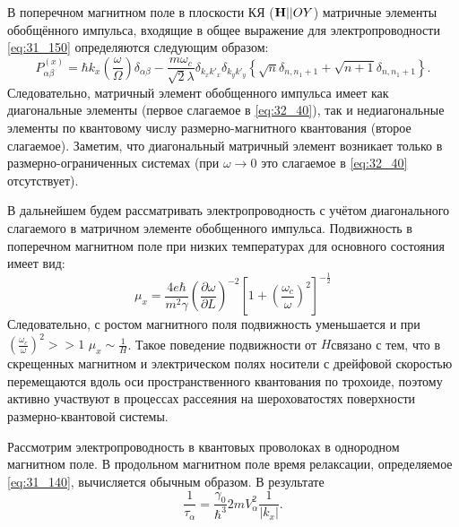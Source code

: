 В поперечном магнитном поле в плоскости КЯ ($\boldsymbol{\mathbf{H}} || OY$) матричные элементы обобщённого импульса, входящие в общее выражение для электропроводности \eqref{eq:31_150} определяются следующим образом:
\begin{equation} \label{eq:32_40}
P_{\alpha \beta }^{\left(x\right)} =\hbar k_{x} \left(\frac{\omega }{\Omega } \right)\delta _{\alpha \beta } -\frac{m\omega _{c} }{\sqrt{2} \lambda } \delta _{k_{x} k'_{x} } \delta _{k_{y} k'_{y} } \left\{\sqrt{n} \delta _{n,n_{1} +1} +\sqrt{n+1} \delta _{n,n_{1} +1} \right\}.
\end{equation}
Следовательно, матричный элемент обобщенного импульса имеет как диагональные элементы (первое слагаемое в \eqref{eq:32_40}), так и недиагональные элементы по квантовому числу размерно-магнитного квантования (второе слагаемое). Заметим, что диагональный матричный элемент возникает только в размерно-ограниченных системах (при $\omega \to 0$ это слагаемое в \eqref{eq:32_40} отсутствует).

В дальнейшем будем рассматривать электропроводность с учётом диагонального слагаемого в матричном элементе обобщенного импульса. Подвижность в поперечном магнитном поле при низких температурах для основного состояния имеет вид:
\begin{equation} \label{eq:32_50}
\mu _{x} =\frac{4e\hbar }{m^{2} \gamma } \left(\frac{\partial \omega }{\partial L} \right)^{-2} \left[1+\left(\frac{\omega _{c} }{\omega } \right)^{2} \right]^{-\frac{1}{2} }
\end{equation}
Следовательно, с ростом магнитного поля подвижность уменьшается и при $\left(\frac{\omega _{c} }{\omega } \right)^{2} >>1$ $\mu _{x} \sim \frac{1}{H} $. Такое поведение подвижности от $H$связано с тем, что в скрещенных магнитном и электрическом полях носители с дрейфовой скоростью перемещаются вдоль оси пространственного квантования по трохоиде, поэтому активно участвуют в процессах рассеяния на шероховатостях поверхности размерно-квантовой системы. 

Рассмотрим электропроводность в квантовых проволоках в однородном магнитном поле. В продольном магнитном поле время релаксации, определяемое \eqref{eq:31_140}, вычисляется обычным образом. В результате
\begin{equation} \label{eq:32_60}
\frac{1}{\tau _{\alpha } } =\frac{\gamma _{0} }{\hbar ^{3} } 2mV_{\alpha }^{2} \frac{1}{\left|k_{x} \right|} . 
\end{equation}

